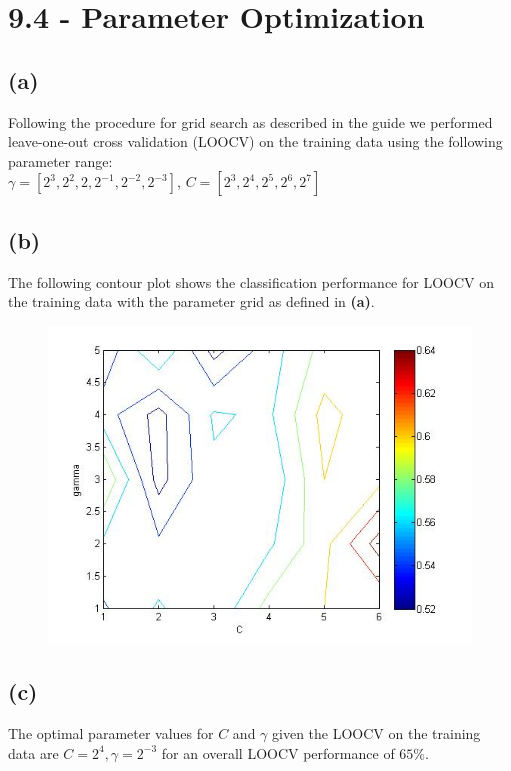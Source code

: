 \documentclass[11pt,a4paper]{article}
\begin{document}
\section*{9.4 - Parameter Optimization}
\subsection*{(a)}
Following the procedure for grid search as described in the guide we performed leave-one-out cross validation (LOOCV) on the training data using the following parameter range:\\
$ \gamma = [2^{3},2^{2},2,2^{-1},2^{-2},2^{-3}] $, $ C = [2^{3},2^{4},2^{5},2^{6},2^{7}]$

\subsection*{(b)}
The following contour plot shows the classification performance for LOOCV on the training data with the parameter grid as defined in \textbf{(a)}.

\begin{figure}[h]
	\includegraphics[width=\linewidth]{perf_contour.jpg}
\end{figure}

\newpage
\subsection*{(c)}
The optimal parameter values for $C$ and $\gamma$ given the LOOCV on the training data are
$C = 2^{4}, \gamma = 2^{-3}$ for an overall LOOCV performance of $65\%$.
\end{document}
